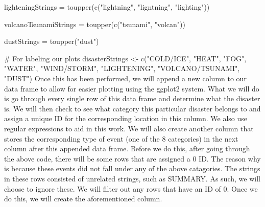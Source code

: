 lighteningStrings = toupper(c("lightning", "ligntning", "lighting"))

volcanoTsunamiStrings = toupper(c("tsunami", "volcan"))

dustStrings = toupper("dust")

# For labeling our plots
disasterStrings <- c("COLD/ICE", "HEAT", "FOG", "WATER", "WIND/STORM", "LIGHTENING", 
    "VOLCANO/TSUNAMI", "DUST")
Once this has been performed, we will append a new column to our data frame to allow for easier plotting using the ggplot2 system. What we will do is go through every single row of this data frame and determine what the disaster is. We will then check to see what category this particular disaster belongs to and assign a unique ID for the corresponding location in this column. We also use regular expressions to aid in this work. We will also create another column that stores the corresponding type of event (one of the 8 categories) in the next column after this appended data frame. Before we do this, after going through the above code, there will be some rows that are assigned a 0 ID. The reason why is because these events did not fall under any of the above catagories. The strings in these rows consisted of unrelated strings, such as SUMMARY. As such, we will choose to ignore these. We will filter out any rows that have an ID of 0. Once we do this, we will create the aforementioned column.

